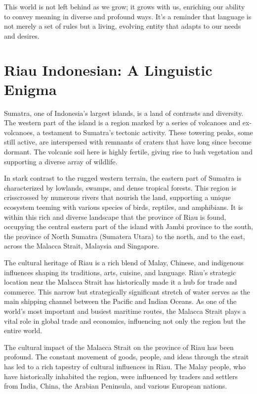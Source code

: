 This world is not left behind as we grow; it grows with us, enriching our ability to convey meaning in diverse and profound ways. It's a reminder that language is not merely a set of rules but a living, evolving entity that adapts to our needs and desires.

\section{Riau Indonesian: A Linguistic Enigma}

Sumatra, one of Indonesia's largest islands, is a land of contrasts and diversity. The western part of the island is a region marked by a series of volcanoes and ex-volcanoes, a testament to Sumatra's tectonic activity. These towering peaks, some still active, are interspersed with remnants of craters that have long since become dormant. The volcanic soil here is highly fertile, giving rise to lush vegetation and supporting a diverse array of wildlife.

In stark contrast to the rugged western terrain, the eastern part of Sumatra is characterized by lowlands, swamps, and dense tropical forests. This region is crisscrossed by numerous rivers that nourish the land, supporting a unique ecosystem teeming with various species of birds, reptiles, and amphibians. It is within this rich and diverse landscape that the province of Riau is found, occupying the central eastern part of the island with Jambi province to the south, the province of North Sumatra (Sumatera Utara) to the north, and to the east, across the Malacca Strait, Malaysia and Singapore.

The cultural heritage of Riau is a rich blend of Malay, Chinese, and indigenous influences shaping its traditions, arts, cuisine, and language. Riau's strategic location near the Malacca Strait has historically made it a hub for trade and commerce. This narrow but strategically significant stretch of water serves as the main shipping channel between the Pacific and Indian Oceans. As one of the world's most important and busiest maritime routes, the Malacca Strait plays a vital role in global trade and economics, influencing not only the region but the entire world.

The cultural impact of the Malacca Strait on the province of Riau has been profound. The constant movement of goods, people, and ideas through the strait has led to a rich tapestry of cultural influences in Riau. The Malay people, who have historically inhabited the region, were influenced by traders and settlers from India, China, the Arabian Peninsula, and various European nations.

